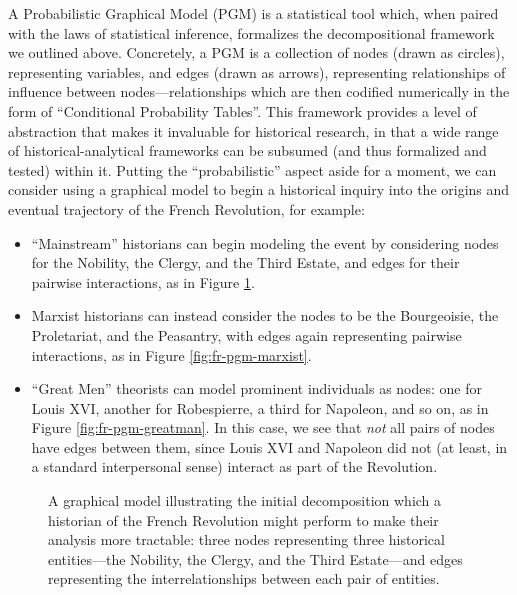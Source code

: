 \documentclass[11pt]{article}
\begin{document}
A Probabilistic Graphical Model (PGM) is a statistical tool which, when paired with the laws of statistical inference, formalizes the decompositional framework we outlined above. Concretely, a PGM is a collection of nodes (drawn as circles), representing variables, and edges (drawn as arrows), representing relationships of influence between nodes---relationships which are then codified numerically in the form of ``Conditional Probability Tables''. This framework provides a level of abstraction that makes it invaluable for historical research, in that a wide range of historical-analytical frameworks can be subsumed (and thus formalized and tested) within it. Putting the ``probabilistic'' aspect aside for a moment, we can consider using a graphical model to begin a historical inquiry into the origins and eventual trajectory of the French Revolution, for example:
\begin{itemize}
	\item ``Mainstream'' historians can begin modeling the event by considering nodes for the Nobility, the Clergy, and the Third Estate, and edges for their pairwise interactions, as in Figure \ref{fig:fr-pgm-mainstream}.
	\item Marxist historians can instead consider the nodes to be the Bourgeoisie, the Proletariat, and the Peasantry, with edges again representing pairwise interactions, as in Figure \ref{fig:fr-pgm-marxist}.
	\item ``Great Men'' theorists can model prominent individuals as nodes: one for Louis XVI, another for Robespierre, a third for Napoleon, and so on, as in Figure \ref{fig:fr-pgm-greatman}. In this case, we see that \textit{not} all pairs of nodes have edges between them, since Louis XVI and Napoleon did not (at least, in a standard interpersonal sense) interact as part of the Revolution.
\end{itemize}

\begin{figure}[ht!]
	\centering
	\caption{A graphical model illustrating the initial decomposition which a historian of the French Revolution might perform to make their analysis more tractable: three nodes representing three historical entities---the Nobility, the Clergy, and the Third Estate---and edges representing the interrelationships between each pair of entities.}
	\label{fig:fr-pgm-mainstream}
\end{figure}
\end{document}
